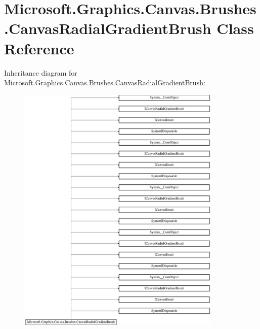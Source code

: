 \hypertarget{class_microsoft_1_1_graphics_1_1_canvas_1_1_brushes_1_1_canvas_radial_gradient_brush}{}\section{Microsoft.\+Graphics.\+Canvas.\+Brushes.\+Canvas\+Radial\+Gradient\+Brush Class Reference}
\label{class_microsoft_1_1_graphics_1_1_canvas_1_1_brushes_1_1_canvas_radial_gradient_brush}
Inheritance diagram for Microsoft.\+Graphics.\+Canvas.\+Brushes.\+Canvas\+Radial\+Gradient\+Brush\+:\begin{figure}[H]
\begin{center}
\leavevmode
\includegraphics[height=12.000000cm]{class_microsoft_1_1_graphics_1_1_canvas_1_1_brushes_1_1_canvas_radial_gradient_brush}
\end{center}
\end{figure}
